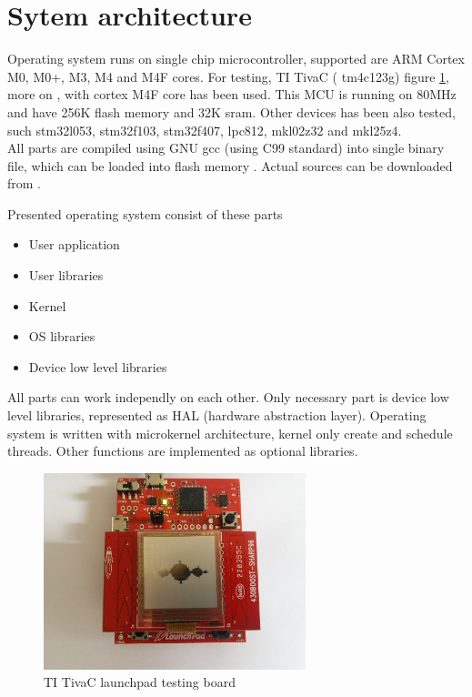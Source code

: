 \documentclass[conference]{IEEEtran}
\begin{document}
\section{Sytem architecture}

Operating system runs on single chip microcontroller, supported are ARM Cortex M0, M0+, M3, M4 and M4F cores. For testing, TI TivaC ( tm4c123g) figure \ref{fig_ti_launchpad}, more on \cite{bib:ti_launchpad}, with cortex M4F core has been used. This MCU is running on 80MHz and have 256K flash memory and 32K sram. Other devices has been also tested, such stm32l053, stm32f103, stm32f407, lpc812, mkl02z32 and mkl25z4. \\
All parts are compiled using GNU gcc (using C99 standard) into single binary file, which can be loaded into flash memory \cite{bib:lm4flash}. Actual sources can be downloaded from \cite{bib:suzuha_git}.

Presented operating system consist of these parts

\begin{itemize}
	\item User application
	\item User libraries
	\item Kernel
	\item OS libraries
	\item Device low level libraries
\end{itemize}

All parts can work independly on each other. Only necessary part is device low level libraries, represented as HAL 
(hardware abstraction layer). Operating system is written with microkernel architecture, kernel only create and schedule threads. Other functions are implemented as optional libraries.

\begin{figure}[!t]
\centering
\includegraphics[width=3.0in]{testing_board_01.jpg}
\caption{TI TivaC launchpad testing board}
\label{fig_ti_launchpad}
\end{figure}
\end{document}
